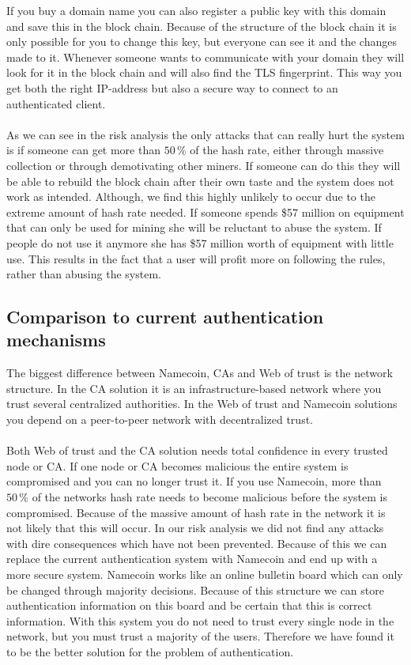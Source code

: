 \documentclass[frame, english]{idamasterthesis}
\begin{document}
\noindent
If you buy a domain name you can also register a public key with this domain and save this in the block chain. Because of the structure of the block chain it is only possible for you to change this key, but everyone can see it and the changes made to it. Whenever someone wants to communicate with your domain they will look for it in the block chain and will also find the TLS fingerprint. This way you get both the right IP-address but also a secure way to connect to an authenticated client.\\\\ As we can see in the risk analysis the only attacks that can really hurt the system is if someone can get more than $50 \, \%$ of the hash rate, either through massive collection or through demotivating other miners. If someone can do this they will be able to rebuild the block chain after their own taste and the system does not work as intended. Although, we find this highly unlikely to occur due to the extreme amount of hash rate needed. If someone spends \$57 million on equipment that can only be used for mining she will be reluctant to abuse the system. If people do not use it anymore she has \$57 million worth of equipment with little use. This results in the fact that a user will profit more on following the rules, rather than abusing the system. 

\subsection{Comparison to current authentication mechanisms}
The biggest difference between Namecoin, CAs and Web of trust is the network structure. In the CA solution it is an infrastructure-based network where you trust several centralized authorities. In the Web of trust and Namecoin solutions you depend on a peer-to-peer network with decentralized trust.\\\\
Both Web of trust and the CA solution needs total confidence in every trusted node or CA. If one node or CA becomes malicious the entire system is compromised and you can no longer trust it. If you use Namecoin, more than $50 \, \%$ of the networks hash rate needs to become malicious before the system is compromised. Because of the massive amount of hash rate in the network it is not likely that this will occur. In our risk analysis we did not find any attacks with dire consequences which have not been prevented. Because of this we can replace the current authentication system with Namecoin and end up with a more secure system. Namecoin works like an online bulletin board which can only be changed through majority decisions. Because of this structure we can store authentication information on this board and be certain that this is correct information. With this system you do not need to trust every single node in the network, but you must trust a majority of the users. Therefore we have found it to be the better solution for the problem of authentication.
    
\end{document}
